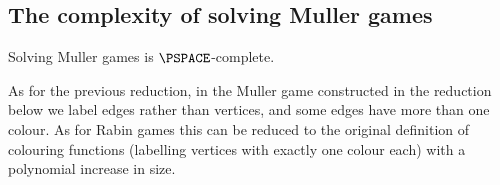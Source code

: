 \subsection*{The complexity of solving Muller games}    
\begin{theorem}
\label{2-thm:complexity_Muller}
Solving Muller games is $\PSPACE$-complete.
\end{theorem}

As for the previous reduction, in the Muller game constructed in the reduction below we label edges rather than vertices,
and some edges have more than one colour.
As for Rabin games this can be reduced to the original definition of colouring functions (labelling vertices with exactly one colour each) with a polynomial increase in size.

